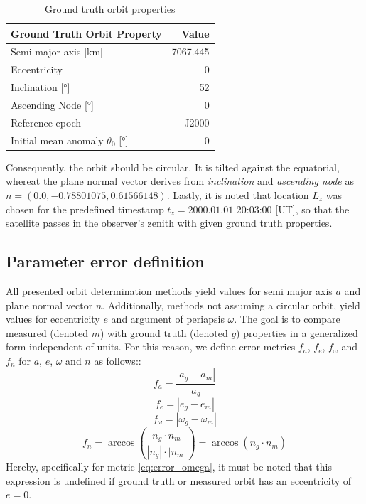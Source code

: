 \documentclass[10pt,a4paper]{article}
\begin{document}
	\begin{table}[H]
		\centering
		\begin{tabular}{l|r}
			Ground Truth Orbit Property & Value \\\hline
			Semi major axis [km] & 7067.445 \\
			Eccentricity & 0 \\
			Inclination [°] & 52 \\
			Ascending Node [°] & 0 \\
			Reference epoch & J2000 \\
			Initial mean anomaly $\theta_0$ [°] & 0
		\end{tabular}
		\caption{\label{tab:ground_truth_orbit}Ground truth orbit properties}
	\end{table}
	\noindent
	Consequently, the orbit should be circular. It is tilted against the equatorial, whereat the plane normal vector derives from \emph{inclination} and \emph{ascending node} as $n=(0.0, -0.78801075, 0.61566148)$.\newline
	Lastly, it is noted that location $L_z$ was chosen for the predefined timestamp $t_z = \text{2000.01.01 20:03:00}$ [UT], so that the satellite passes in the observer's zenith with given ground truth properties.
	
	\subsection{Parameter error definition}\label{sec:param_stability_definition}
	All presented orbit determination methods yield values for semi major axis $a$ and plane normal vector $n$. Additionally, methods not assuming a circular orbit, yield values for eccentricity $e$ and argument of periapsis $\omega$. The goal is to compare measured (denoted $m$) with ground truth (denoted $g$) properties in a generalized form independent of units. For this reason, we define error metrics $f_a$, $f_e$, $f_{\omega}$ and $f_n$ for $a$, $e$, $\omega$ and $n$ as follows::\newline
	\begin{equation}\label{eq:error_sma}
		f_a=\frac{|a_g-a_m|}{a_g}
	\end{equation}
	\begin{equation}\label{eq:error_ecc}
		f_e=|e_g-e_m|
	\end{equation}
	\begin{equation}\label{eq:error_omega}
		f_\omega=|\omega_g-\omega_m|
	\end{equation}
	\begin{equation}\label{eq:error_n}
		f_n=\arccos\left(\frac{n_g\cdot n_m}{|n_g|\cdot|n_m|}\right)=\arccos(n_g\cdot n_m)
	\end{equation}
	Hereby, specifically for metric \ref{eq:error_omega}, it must be noted that this expression is undefined if ground truth or measured orbit has an eccentricity of $e=0$.
	
\end{document}
